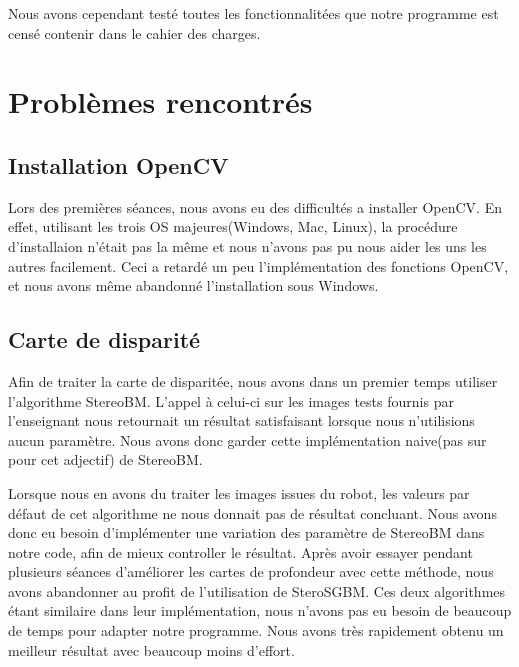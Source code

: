\documentclass[a4paper]{article}
\begin{document}
Nous avons cependant testé toutes les fonctionnalitées que notre programme est censé contenir dans le cahier des charges.


\section{Problèmes rencontrés}


\subsection*{Installation OpenCV}

Lors des premières séances, nous avons eu des difficultés a installer OpenCV. En effet, utilisant les trois OS majeures(Windows, Mac, Linux), la procédure d'installaion n'était pas la même et nous n'avons pas pu nous aider les uns les autres facilement. Ceci a retardé un peu l'implémentation des fonctions OpenCV, et nous avons même abandonné l'installation sous Windows.

\subsection*{Carte de disparité}

Afin de traiter la carte de disparitée, nous avons dans un premier temps utiliser l'algorithme StereoBM. L'appel à celui-ci sur les images tests fournis par l'enseignant nous retournait un résultat satisfaisant lorsque nous n'utilisions aucun paramètre. Nous avons donc garder cette implémentation naive(pas sur pour cet adjectif) de StereoBM.

Lorsque nous en avons du traiter les images issues du robot, les valeurs par défaut de cet algorithme ne nous donnait pas de résultat concluant. Nous avons donc eu besoin d'implémenter une variation des paramètre de StereoBM dans notre code, afin de mieux controller le résultat. Après avoir essayer pendant plusieurs séances d'améliorer les cartes de profondeur avec cette méthode, nous avons abandonner au profit de l'utilisation de SteroSGBM. Ces deux algorithmes étant similaire dans leur implémentation, nous n'avons pas eu besoin de beaucoup de temps pour adapter notre programme. Nous avons très rapidement obtenu un meilleur résultat avec beaucoup moins d'effort.
\end{document}
